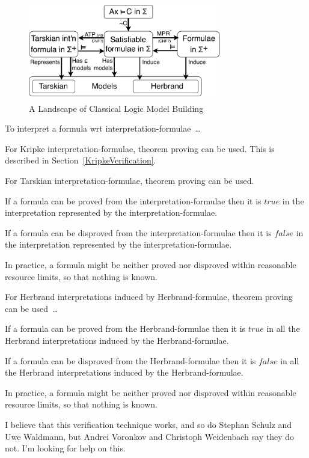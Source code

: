 \documentclass{easychair}
\newenvironment{packed_itemize}{
\vspace*{-0.3em}
\begin{itemize}
\setlength{\partopsep}{0pt}
\setlength{\itemsep}{1pt}
\setlength{\parskip}{0pt}
\setlength{\parsep}{0pt}
}{\end{itemize}}
\begin{document}
\begin{figure}[htbp]
\centering
\includegraphics[width=0.75\textwidth]{ModelLandscape.pdf}
\caption{A Landscape of Classical Logic Model Building}
\label{ModelLandscape}
\end{figure}

To interpret a formula wrt interpretation-formulae~\ldots
\begin{packed_itemize}
\item For Kripke interpretation-formulae, theorem proving can be used.
      This is described in Section~\ref{KripkeVerification}.
\item For Tarskian interpretation-formulae, theorem proving can be used.
      \begin{packed_itemize}
      \item If a formula can be proved from the interpretation-formulae then it is $true$ in the 
            interpretation represented by the interpretation-formulae.
      \item If a formula can be disproved from the interpretation-formulae then it is $false$ in 
            the interpretation represented by the interpretation-formulae.
      \item In practice, a formula might be neither proved nor disproved within reasonable 
            resource limits, so that nothing is known.
      \end{packed_itemize}
\item For Herbrand interpretations induced by Herbrand-formulae, theorem proving can be used~\ldots
      \begin{packed_itemize}
      \item If a formula can be proved from the Herbrand-formulae then it is $true$ in all the 
            Herbrand interpretations induced by the Herbrand-formulae.
      \item If a formula can be disproved from the Herbrand-formulae then it is $false$ in all 
            the Herbrand interpretations induced by the Herbrand-formulae.
      \item In practice, a formula might be neither proved nor disproved within reasonable 
            resource limits, so that nothing is known.
      \end{packed_itemize}
      I believe that this verification technique works, and so do Stephan Schulz and Uwe Waldmann,
      but Andrei Voronkov and Christoph Weidenbach say they do not.
      I'm looking for help on this.
\end{packed_itemize}
\end{document}
